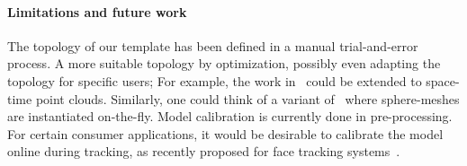 \paragraph{Limitations and future work} 
The topology of our template has been defined in a manual trial-and-error process. A more suitable topology  by optimization, possibly even adapting the topology for specific users; For example, the work in~\cite{thiery2016spheremesh} could be extended to space-time point clouds. Similarly, one could think of a variant of~\cite{newcombe2015dynfusion} where sphere-meshes are instantiated on-the-fly.
% 
% 
Model calibration is currently done in pre-processing. For certain consumer applications, it would be desirable to calibrate the model online during tracking, as recently proposed for face tracking systems~\cite{bouaziz2013online}. 
% 
